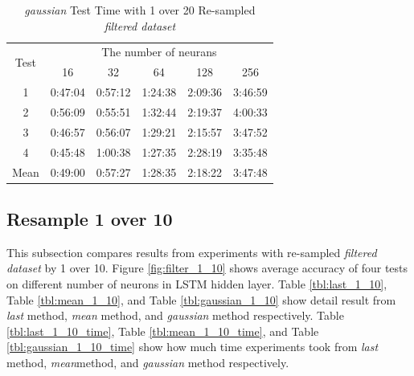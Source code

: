 \documentclass[draft,dvipsnames]{drexel-thesis}
\begin{document}
\begin{thesis}
\begin{table}[!t]
\centering
\caption{{\em gaussian} Test Time with 1 over 20 Re-sampled {\em filtered dataset}}
\label{tbl:gaussian_1_20_time}
\begin{tabular}{|c|c|c|c|c|c|}
\hline
\multirow{2}{*}{Test}      & \multicolumn{5}{c|}{The number of neurans}                                                                                                               \\ \cline{2-6}
                           & 16                           & 32                           & 64                           & 128                          & 256                          \\ \hline
1                          & 0:47:04                      & 0:57:12                      & 1:24:38                      & 2:09:36                      & 3:46:59                      \\ \hline
2                          & 0:56:09                      & 0:55:51                      & 1:32:44                      & 2:19:37                      & 4:00:33                      \\ \hline
3                          & 0:46:57                      & 0:56:07                      & 1:29:21                      & 2:15:57                      & 3:47:52                      \\ \hline
4                          & 0:45:48                      & 1:00:38                      & 1:27:35                      & 2:28:19                      & 3:35:48                      \\ \hline
\multicolumn{1}{|l|}{Mean} & \multicolumn{1}{l|}{0:49:00} & \multicolumn{1}{l|}{0:57:27} & \multicolumn{1}{l|}{1:28:35} & \multicolumn{1}{l|}{2:18:22} & \multicolumn{1}{l|}{3:47:48} \\ \hline
\end{tabular}
\end{table}


\subsection{Resample 1 over 10}
This subsection compares results from experiments with re-sampled {\em filtered dataset} by 1 over 10. Figure \ref{fig:filter_1_10} shows average accuracy of four tests on different number of neurons in LSTM hidden layer. Table \ref{tbl:last_1_10}, Table \ref{tbl:mean_1_10}, and Table \ref{tbl:gaussian_1_10} show detail result from {\em last} method, {\em mean} method, and {\em gaussian} method respectively. Table \ref{tbl:last_1_10_time}, Table \ref{tbl:mean_1_10_time}, and Table \ref{tbl:gaussian_1_10_time} show how much time experiments took from {\em last} method, {\em mean}method, and {\em gaussian} method respectively.


\end{thesis}
\end{document}
